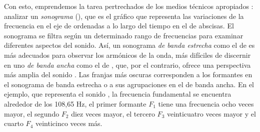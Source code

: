 Con esto, emprendemos la tarea pertrechados de los medios técnicos apropiados \parencite{boersma2022}: analizar un \textit{sonograma} (), que es el gráfico que representa las variaciones de la frecuencia en el eje de ordenadas a lo largo del tiempo en el de abscisas. El sonograma se filtra según un determinado rango de frecuencias para examinar diferentes aspectos del sonido. Así, un sonograma \textit{de banda estrecha} como el de  es más adecuados para observar los armónicos de la onda, más difíciles de discernir en uno \textit{de banda ancha} como el de , que, por el contrario, ofrece una perspectiva más amplia del sonido \parencite[95-96]{clegg2018}. Las franjas más oscuras corresponden a los formantes en el sonograma de banda estrecha o a sus agrupaciones en el de banda ancha. En el ejemplo, que representa el sonido , la frecuencia fundamental se encuentra alrededor de los 108,65 Hz, el primer formante $F_1$ tiene una frecuencia ocho veces mayor, el segundo $F_2$ diez veces mayor, el tercero $F_3$ veinticuatro veces mayor y el cuarto $F_4$  veinticinco veces más.

